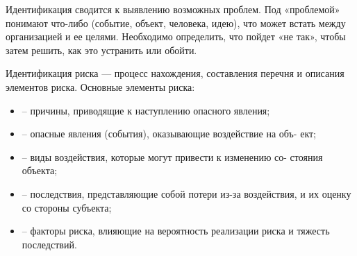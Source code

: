 Идентификация сводится к выявлению возможных проблем. 
Под «проблемой» понимают что-либо (событие, объект, человека, идею), что может встать между организацией и ее целями.
Необходимо определить, что пойдет «не так», чтобы затем решить, как это устранить или обойти.

Идентификация риска --- процесс нахождения, составления перечня и описания элементов риска.
Основные элементы риска:
\begin{itemize}
\item  – причины, приводящие к наступлению опасного явления;
\item – опасные явления (события), оказывающие воздействие на объ-
ект;
\item – виды воздействия, которые могут привести к изменению со-
стояния объекта;
\item – последствия, представляющие собой потери из-за воздействия,
и их оценку со стороны субъекта;
\item – факторы риска, влияющие на вероятность реализации риска
и тяжесть последствий.
\end{itemize}
